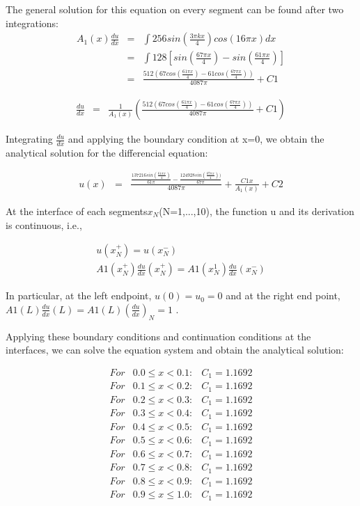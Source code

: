 \documentclass[paper=a4, fontsize=11pt]{article} %
\begin{document}
The general solution for this equation on every segment can be found after two integrations:
\begin{eqnarray}
\label{du_ana}
A_1(x)\frac{du}{dx}&=& \int 256sin(\frac{3\pi kx}{4})cos(16 \pi x) dx\nonumber\\
&=& \int 128[sin(\frac{67 \pi x}{4}) - sin(\frac{61 \pi x}{4})]\nonumber\\
&=& \frac{512(67cos(\frac{61\pi x}{4})- 61cos(\frac{67\pi x}{4}))}{4087\pi} + C1
\end{eqnarray}

\begin{eqnarray}
\frac{du}{dx} &=& \frac{1}{A_1(x)} (\frac{ 512( 67cos( \frac{61\pi x}{4} )- 61cos( \frac{67\pi x}{4} ) ) }  {4087\pi} + C1)
\end{eqnarray}

Integrating $\frac{du}{dx}$ and applying the boundary condition at x=0, we obtain the analytical solution for the differencial equation:

\begin{eqnarray}
u(x)&=& \frac{\frac{137216sin(\frac{61\pi x}{4})}{61\pi}- \frac{124928sin(\frac{67\pi x}{4}))}{67\pi}}{4087\pi} + \frac{C1x} {A_1(x)} + C2
\end{eqnarray}



At the interface of each segments$x_N$(N=1,...,10), the function u and its derivation is continuous, i.e.,

\begin{eqnarray}
u(x_N^+) = u(x_N^-) \nonumber\\
A1(x_N^+)\frac{du} {dx}(x_N^+) = A1(x_N^1)\frac{du}{dx}(x_N^-)
\end{eqnarray}

In particular, at the left endpoint, $u(0) = u_0 = 0$ and at the right end point, $A1(L)\frac{du}{dx} (L) = A1(L)(\frac{du}{dx})_N = 1 $ .

Applying these boundary conditions and continuation conditions at the interfaces, we can solve the equation system and obtain the analytical solution:

\begin{eqnarray}
For & 0.0 \leq x < 0.1 :& C_1 = 1.1692 \nonumber\\
For & 0.1 \leq x < 0.2 :& C_1 = 1.1692 \nonumber\\
For & 0.2 \leq x < 0.3 :& C_1 = 1.1692 \nonumber\\
For & 0.3 \leq x < 0.4 :& C_1 = 1.1692 \nonumber\\
For & 0.4 \leq x < 0.5 :& C_1 = 1.1692 \nonumber\\
For & 0.5 \leq x < 0.6 :& C_1 = 1.1692 \nonumber\\
For & 0.6 \leq x < 0.7 :& C_1 = 1.1692 \nonumber\\
For & 0.7 \leq x < 0.8 :& C_1 = 1.1692 \nonumber\\
For & 0.8 \leq x < 0.9 :& C_1 = 1.1692\nonumber\\
For & 0.9 \leq x \leq 1.0 :& C_1 = 1.1692
\end{eqnarray}
\end{document}
